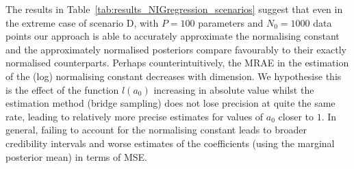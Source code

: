 \documentclass[a4paper, notitlepage, 11pt]{article}
\begin{document}
The results in Table~\ref{tab:results_NIGregression_scenarios}  suggest that even in the extreme case of scenario D, with $P=100$ parameters and $N_0 = 1000$ data points our approach is able to accurately approximate the normalising constant and the approximately normalised posteriors compare favourably to their exactly normalised counterparts.
Perhaps counterintuitively, the MRAE in the estimation of the (log) normalising constant decreases with dimension.
We hypothesise this is the effect of the function $l(a_0)$ increasing in absolute value whilst the estimation method (bridge sampling) does not lose precision at quite the same rate, leading to relatively more precise estimates for values of $a_0$ closer to $1$.
In general, failing to account for the normalising constant leads to broader credibility intervals and worse estimates of the coefficients (using the marginal posterior mean) in terms of MSE.
\end{document}
